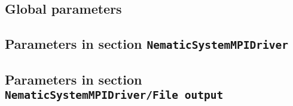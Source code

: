 \subsection{Global parameters}
\label{parameters:global}



\subsection{Parameters in section \tt NematicSystemMPIDriver}
\label{parameters:NematicSystemMPIDriver}


\subsection{Parameters in section \tt NematicSystemMPIDriver/File output}
\label{parameters:NematicSystemMPIDriver/File_20output}

